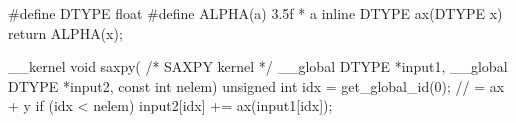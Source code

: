 #define DTYPE float
#define ALPHA(a) 3.5f * a
inline DTYPE ax(DTYPE x) { return ALPHA(x); }

__kernel void saxpy( /* SAXPY kernel */
__global DTYPE *input1,
__global DTYPE *input2,
const int nelem)
{
unsigned int idx = get_global_id(0);
// = ax + y
if (idx < nelem) {
input2[idx] += ax(input1[idx]); }}
